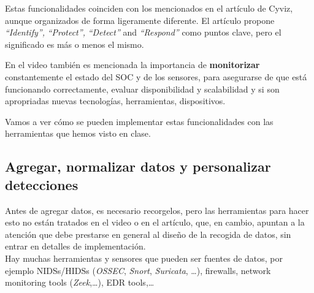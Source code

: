 Estas funcionalidades coinciden con los mencionados en el artículo de Cyviz, aunque organizados de forma ligeramente diferente.
El artículo propone \textit{``Identify'',} \textit{``Protect'',} \textit{``Detect''} and \textit{``Respond''} como puntos clave, pero el significado es más o menos el mismo.


En el video también es mencionada la importancia de \textbf{monitorizar} constantemente el estado del SOC y de los sensores, para asegurarse de que está funcionando correctamente, evaluar disponibilidad y scalabilidad y si son apropriadas nuevas tecnologías, herramientas, dispositivos.


Vamos a ver cómo se pueden implementar estas funcionalidades con las herramientas que hemos visto en clase.
\subsection{Agregar, normalizar datos y personalizar detecciones}

   


Antes de agregar datos, es necesario recorgelos, pero las herramientas para hacer esto no están tratados en el video o en el artículo, que, en cambio, apuntan a la atención que debe prestarse en general al diseño de la recogida de datos, sin entrar en detalles de implementación.\\
Hay muchas herramientas y sensores que pueden ser fuentes de datos, por ejemplo NIDSs/HIDSs (\textsl{OSSEC}, \textsl{Snort}, \textsl{Suricata}, \dots), firewalls, network monitoring tools (\textsl{Zeek},\dots), EDR tools,\dots
{}

